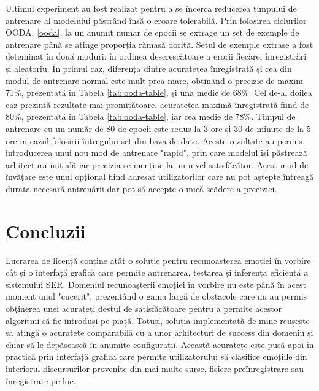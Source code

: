 \documentclass[a4paper,12pt]{book}
\begin{document}
		 Ultimul experiment au fost realizat pentru a se încerca reducerea timpului de antrenare al modelului păstrând însă o eroare tolerabilă. Prin folosirea ciclurilor OODA, \ref{ooda}, la un anumit număr de epocii se extrage un set de exemple de antrenare până se atinge proporția rămasă dorită. Setul de exemple extrase a fost deteminat în două moduri: în ordinea descrescătoare a erorii fiecărei înregistrări și aleatoriu. În primul caz, diferența dintre acuratețea înregistrată și cea din modul de antrenare normal este mult prea mare, obținând o precizie de maxim 71\%, prezentată în Tabela \ref{tab:ooda-table}, și una medie de 68\%. Cel de-al doilea caz prezintă rezultate mai promițătoare, acuratețea maximă înregistrată fiind de 80\%, prezentată în Tabela \ref{tab:ooda-table}, iar cea medie de 78\%. Timpul de antrenare cu un număr de 80 de epocii este redus la 3 ore și 30 de minute de la 5 ore in cazul folosirii întregului set din baza de date. Aceste rezultate au permis introducerea unui nou mod de antrenare "rapid", prin care modelul își păstrează arhitectura inițială iar precizia se menține la un nivel satisfăcător. Acest mod de învățare este unul opțional fiind adresat utilizatorilor care nu pot aștepte întreagă durata necesară antrenării dar pot să accepte o mică scădere a preciziei. \par
		\chapter{Concluzii}		
		Lucrarea de licență conține atât o soluție pentru recunoașterea emoției în vorbire cât și o interfață grafică care permite antrenarea, testarea și inferența eficientă a sistemului SER. Domeniul recunoașterii emoției în vorbire nu este până în acest moment unul "cucerit", prezentând o gama largă de obstacole care nu au permis obținerea unei acurateți destul de satisfăcătoare pentru a permite acestor algoritmi să fie introduși pe piață. Totuși, soluția implementată de mine reușește să atingă o acuratețe comparabilă cu a unor arhitecturi de success din domeniu și chiar să le depășească în anumite configurații. Această acuratețe este pusă apoi în practică prin interfață grafică care permite utilizatorului să clasifice emoțiile din interiorul discursurilor provenite din mai multe surse, fișiere preînregistrare sau înregistrate pe loc. \par		
		
\end{document}
